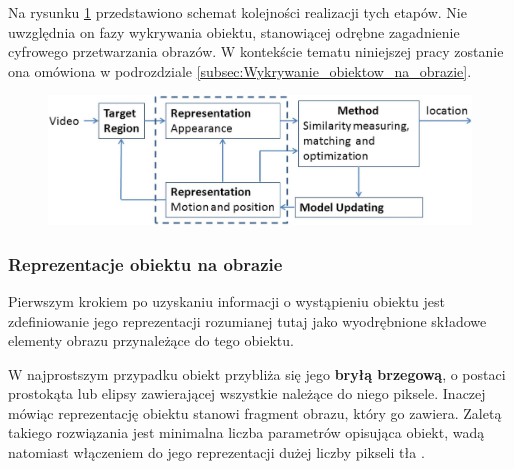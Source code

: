 Na rysunku \ref{fig:Ogolny_model_dzialania_algorytmow_sledzenia_obiektow} przedstawiono schemat kolejności realizacji tych etapów. Nie uwzględnia on fazy wykrywania obiektu, stanowiącej odrębne zagadnienie cyfrowego przetwarzania obrazów. W kontekście tematu niniejszej pracy zostanie ona omówiona w podrozdziale \ref{subsec:Wykrywanie_obiektow_na_obrazie}.

\begin{figure}[!htb]
	\begin{center}
		\includegraphics[width=12cm]{images/object_trackers_reference_model.png}
	\end{center}	
\label{fig:Ogolny_model_dzialania_algorytmow_sledzenia_obiektow}
\end{figure}

\subsubsection{Reprezentacje obiektu na obrazie}
\label{subsubsec:Reprezentacje_obiektu_na_obrazie}

Pierwszym krokiem po uzyskaniu informacji o wystąpieniu obiektu jest zdefiniowanie jego reprezentacji rozumianej tutaj jako wyodrębnione składowe elementy obrazu przynależące do tego obiektu.

W najprostszym przypadku obiekt przybliża się jego \textbf{bryłą brzegową}, o postaci prostokąta lub elipsy zawierającej wszystkie należące do niego piksele. Inaczej mówiąc reprezentację obiektu stanowi fragment obrazu, który go zawiera. Zaletą takiego rozwiązania jest minimalna liczba parametrów opisująca obiekt, wadą natomiast włączeniem do jego reprezentacji dużej liczby pikseli tła \cite{Smeulders2010}.

